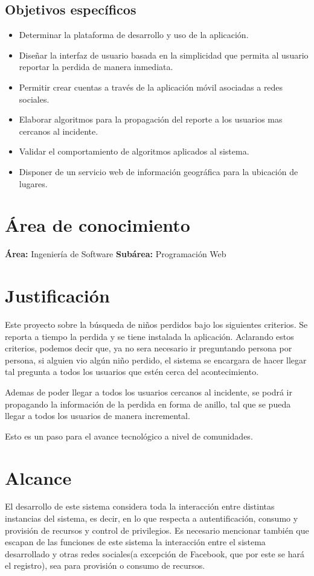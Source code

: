 \documentclass[letter,11pt,oneside,spanish]{article}
\begin{document}
\subsection{Objetivos específicos}
\begin{itemize}
\item Determinar la plataforma de desarrollo y uso de la aplicación.
\item Diseñar la interfaz de usuario basada en la simplicidad que permita al usuario reportar la perdida de manera inmediata.
\item Permitir crear cuentas a través de la aplicación móvil asociadas a redes sociales.
\item Elaborar algoritmos para la propagación del reporte a los usuarios mas cercanos al incidente.
\item Validar el comportamiento de algoritmos aplicados al sistema.
\item Disponer de un servicio web de información geográfica \cite{Delphi2} para la ubicación de lugares.
\end{itemize}

\section{Área de conocimiento}
\textbf{Área:} Ingeniería de Software
\textbf{Subárea:} Programación Web

\section{Justificación}
Este proyecto sobre la búsqueda de niños perdidos bajo los siguientes criterios. Se reporta a tiempo la perdida y se tiene instalada la aplicación.
Aclarando estos criterios, podemos decir que, ya no sera necesario ir preguntando persona por persona, si alguien vio
algún niño perdido, el sistema se encargara de hacer llegar tal pregunta a 
todos los  usuarios que estén cerca del acontecimiento.

Ademas de poder llegar a todos los usuarios cercanos al incidente, se podrá 
ir propagando la información de la perdida en forma de anillo, tal que se pueda
llegar a todos los usuarios de manera incremental.

Esto es un paso para el avance tecnológico a nivel de comunidades.

\section{Alcance}
El desarrollo de este sistema considera toda la interacción entre distintas
instancias del sistema, es decir, en lo que respecta a autentificación, consumo y provisión de recursos y control de privilegios. Es necesario mencionar
también que escapan de las funciones de este sistema la interacción entre el
sistema desarrollado y otras redes sociales(a excepción de Facebook, que por este se hará el registro), sea para provisión o consumo de
recursos.
\end{document}
